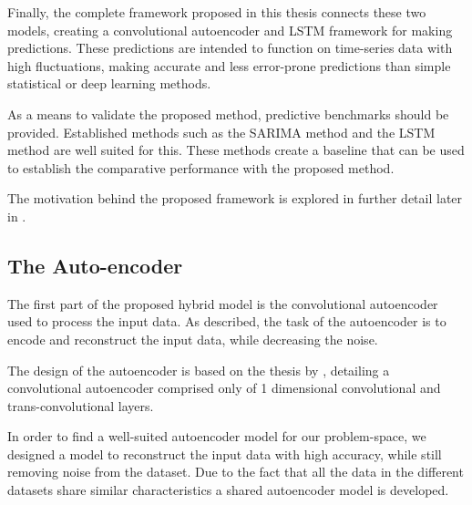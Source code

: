 Finally, the complete framework proposed in this thesis connects these two models,
creating a convolutional autoencoder and LSTM framework for making predictions.
These predictions are intended to function on time-series data with high fluctuations,
making accurate and less error-prone predictions than simple statistical or deep learning methods.


As a means to validate the proposed method, predictive benchmarks should be provided.
Established methods such as the SARIMA method and the LSTM method are well suited for this.
These methods create a baseline that can be used to establish the comparative performance with the proposed method.

The motivation behind the proposed framework is explored in further detail later in .



\subsection{The Auto-encoder}

The first part of the proposed hybrid model is the convolutional autoencoder used to process the input data.
As described, the task of the autoencoder is to encode and reconstruct the input data,
while decreasing the noise.

The design of the autoencoder is based on the thesis by \cite{Zhao2019},
detailing a convolutional autoencoder comprised only of 1 dimensional convolutional and trans-convolutional layers.


In order to find a well-suited autoencoder model for our problem-space,
we designed a model to reconstruct the input data with high accuracy,
while still removing noise from the dataset.
Due to the fact that all the data in the different datasets share similar characteristics
a shared autoencoder model is developed.




